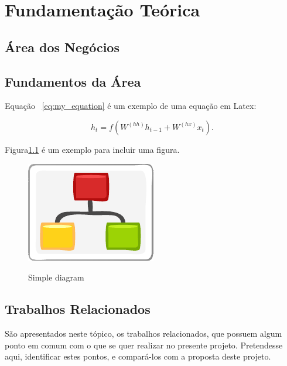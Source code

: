 
\chapter{Fundamentação Teórica}\label{chap:background}


\section{Área dos Negócios}\label{sec:business}


\section{Fundamentos da Área}\label{sec:fundamental}

Equação ~\ref{eq:my_equation} é um exemplo de uma equação em Latex:


\begin{equation}\label{eq:my_equation}
    h_t = f(W^{(hh)}h_{t-1} + W^{(hx)}x_t).
\end{equation}


Figura\ref{fig:diagram} é um exemplo para incluir uma figura.

\begin{figure}[htb]
    \caption{Simple diagram}
    \centering
    \includegraphics[scale=1.9]{img/diagram.pdf}
    \label{fig:diagram}
\end{figure}

\cite{GRIEBLER:IJPP:18}


\cite{MACCOOL:structured_patterns:book:12}


\section{Trabalhos Relacionados}\label{sec:rw}

São apresentados neste tópico, os trabalhos relacionados, que possuem
algum ponto em comum com o que se quer realizar no presente projeto.
Pretendesse aqui, identificar estes pontos, e compará-los com a proposta deste projeto.

